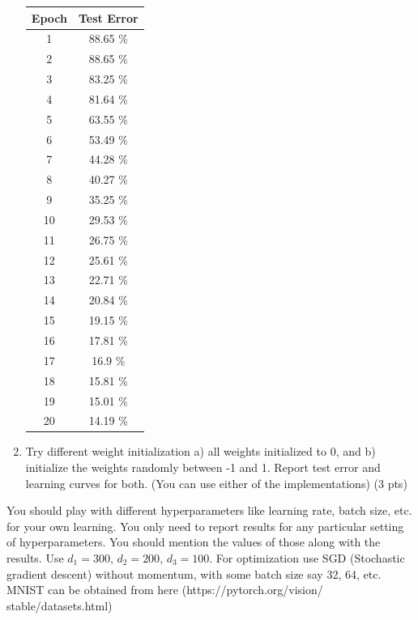 \documentclass[a4paper]{article}
\theoremstyle{definition}
\newenvironment{soln}{
    \leavevmode\color{blue}\ignorespaces
}{}
\begin{document}
\begin{enumerate}
\begin{soln}
        \begin{center}
            \begin{tabular}{c | c}
                Epoch & Test Error \\ \hline
                1 & 88.65 \% \\
                2 & 88.65 \% \\
                3 & 83.25 \% \\
                4 & 81.64 \% \\
                5 & 63.55 \% \\
                6 & 53.49 \% \\
                7 & 44.28 \% \\
                8 & 40.27 \% \\
                9 & 35.25 \% \\
                10 & 29.53 \% \\
                11 & 26.75 \% \\
                12 & 25.61 \% \\
                13 & 22.71 \% \\
                14 & 20.84 \% \\
                15 & 19.15 \% \\
                16 & 17.81 \% \\
                17 & 16.9 \% \\
                18 & 15.81 \% \\
                19 & 15.01 \% \\
                20 & 14.19 \% \\
            \end{tabular}
        \end{center}
    \end{soln}

    \item Try different weight initialization a) all weights initialized to 0, and b) initialize the weights randomly between -1 and 1. Report test error and learning curves for both. (You can use either of the implementations) (3 pts)
\end{enumerate}

You should play with different hyperparameters like learning rate, batch size, etc. for your own learning. You only need to report results for any particular setting of hyperparameters. You should mention the values of those along with the results. Use $d_1 = 300$, $d_2 = 200$, $d_3 = 100$. For optimization use SGD (Stochastic gradient descent) without momentum, with some batch size say 32, 64, etc. MNIST can be obtained from here (https://pytorch.org/vision/ stable/datasets.html)


\end{document}
